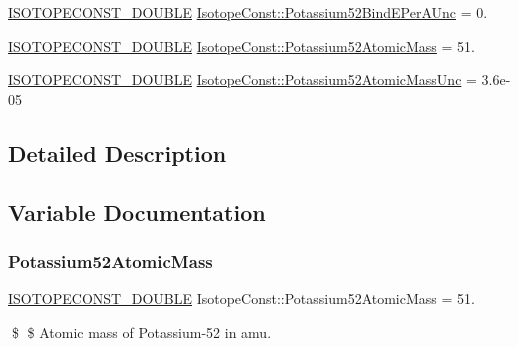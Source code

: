 \begin{DoxyCompactItemize}
\mbox{\hyperlink{group___isotope_const-_macros_ga8f45a7272ce02c0b4c65c44636ed719a}{I\+S\+O\+T\+O\+P\+E\+C\+O\+N\+S\+T\+\_\+\+D\+O\+U\+B\+LE}} \mbox{\hyperlink{group___isotope_const-_potassium-_k52_ga114e2c2280daebfb4c2b7146d508481b}{Isotope\+Const\+::\+Potassium52\+Bind\+E\+Per\+A\+Unc}} = 0.
\item 
\mbox{\hyperlink{group___isotope_const-_macros_ga8f45a7272ce02c0b4c65c44636ed719a}{I\+S\+O\+T\+O\+P\+E\+C\+O\+N\+S\+T\+\_\+\+D\+O\+U\+B\+LE}} \mbox{\hyperlink{group___isotope_const-_potassium-_k52_ga15b80a782b3e0549ea5e297e7774b91d}{Isotope\+Const\+::\+Potassium52\+Atomic\+Mass}} = 51.
\item 
\mbox{\hyperlink{group___isotope_const-_macros_ga8f45a7272ce02c0b4c65c44636ed719a}{I\+S\+O\+T\+O\+P\+E\+C\+O\+N\+S\+T\+\_\+\+D\+O\+U\+B\+LE}} \mbox{\hyperlink{group___isotope_const-_potassium-_k52_ga012a786d41bae184a214835bf084d13f}{Isotope\+Const\+::\+Potassium52\+Atomic\+Mass\+Unc}} = 3.\+6e-\/05
\end{DoxyCompactItemize}


\subsection{Detailed Description}


\subsection{Variable Documentation}
\mbox{\label{group___isotope_const-_potassium-_k52_ga15b80a782b3e0549ea5e297e7774b91d}} 
\subsubsection{\texorpdfstring{Potassium52\+Atomic\+Mass}{Potassium52AtomicMass}}
{\footnotesize\ttfamily \mbox{\hyperlink{group___isotope_const-_macros_ga8f45a7272ce02c0b4c65c44636ed719a}{I\+S\+O\+T\+O\+P\+E\+C\+O\+N\+S\+T\+\_\+\+D\+O\+U\+B\+LE}} Isotope\+Const\+::\+Potassium52\+Atomic\+Mass = 51.}

\$ \$ Atomic mass of Potassium-\/52 in amu. \mbox{\label{group___isotope_const-_potassium-_k52_ga012a786d41bae184a214835bf084d13f}} 
